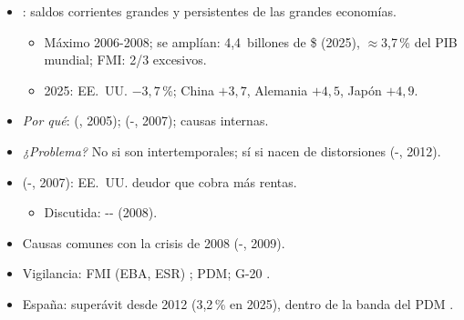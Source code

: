 \documentclass{article}
\begin{document}
\begin{columnas}
\begin{itemize}
\item {}: saldos corrientes grandes y persistentes de las grandes economías.
  \begin{itemize}
  \item Máximo 2006-2008; se amplían: 4,4~billones de \$ (2025), $\approx$3,7\,\% del PIB mundial; FMI: 2/3 excesivos.
  \item 2025: EE.~UU. $-3{,}7$\,\%; China $+3{,}7$, Alemania $+4{,}5$, Japón $+4{,}9$.
  \end{itemize}
\item \emph{Por qué}:  (, 2005);  (-, 2007); causas internas.
\item \emph{¿Problema?} No si son intertemporales; sí si nacen de distorsiones (-, 2012).
\item {} (-, 2007): EE.~UU. deudor que cobra más rentas.
  \begin{itemize}
  \item Discutida: -- (2008).
  \end{itemize}
\item Causas comunes con la crisis de 2008 (-, 2009).
\item Vigilancia: FMI (EBA, ESR) ; PDM; G-20 .
\item España: superávit desde 2012 (3,2\,\% en 2025), dentro de la banda del PDM .
\end{itemize}


\end{columnas}
\end{document}
